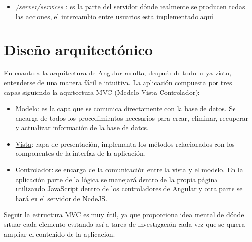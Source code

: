 \begin{itemize}
\begin{landscape}
  \end{landscape}

\item\emph{/server/services} : 	es la parte del servidor dónde realmente se producen todas las acciones, el intercambio entre usuarios esta implementado aquí .
	
	
	
\end{itemize}



\begin{landscape}

  \end{landscape}

\section{Diseño arquitectónico}\label{darquitectura}
En cuanto a la arquitectura de Angular resulta, después de todo lo ya visto, entenderse de una manera fácil e intuitiva. La aplicación compuesta por tres capas siguiendo la aquitectura MVC (Modelo-Vista-Controlador):
\begin{itemize}

\item \underline{Modelo}: es la capa que se comunica directamente con la base de datos. Se encarga de todos los procedimientos necesarios para crear, eliminar, recuperar y actualizar información de la base de datos.

\item \underline{Vista}: capa de presentación, implementa los métodos relacionados con los componentes de la interfaz de la aplicación.

 \item \underline{Controlador}: se encarga de la comunicación entre la vista y el modelo. En la aplicación parte de la lógica se manejará dentro de la propia página utilizando JavaScript dentro de los controladores de Angular y otra parte se hará en el servidor de NodeJS.

\end{itemize}


Seguir la estructura MVC es muy útil, ya que proporciona idea mental de dónde situar cada elemento evitando así a tarea de investigación cada vez que se quiera ampliar el contenido de la aplicación.





